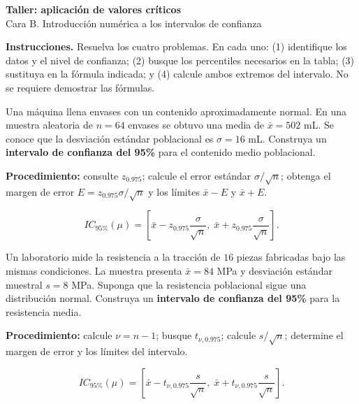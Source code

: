 \documentclass[
  spanish,
  12pt,
  letterpaper]{article}
\begin{document}
\newpage

\begin{center}
{\Large\bfseries Taller: aplicación de valores críticos}\\[-1pt]
{\small Cara B. Introducción numérica a los intervalos de confianza}
\end{center}

\textbf{Instrucciones.} Resuelva los cuatro problemas. En cada uno: (1)
identifique los datos y el nivel de confianza; (2) busque los
percentiles necesarios en la tabla; (3) sustituya en la fórmula
indicada; y (4) calcule ambos extremos del intervalo. No se requiere
demostrar las fórmulas.

\par\vspace{3pt}

Una máquina llena envases con un contenido aproximadamente normal. En
una muestra aleatoria de \(n=64\) envases se obtuvo una media de
\(\bar x=502\) mL. Se conoce que la desviación estándar poblacional es
\(\sigma=16\) mL. Construya un \textbf{intervalo de confianza del 95\%}
para el contenido medio poblacional.

\textbf{Procedimiento:} consulte \(z_{0.975}\); calcule el error
estándar \(\sigma/\sqrt n\); obtenga el margen de error
\(E=z_{0.975}\sigma/\sqrt n\) y los límites \(\bar x-E\) y \(\bar x+E\).

\[IC_{95\%}(\mu)=\left[\bar x-z_{0.975}\frac{\sigma}{\sqrt n},\;\bar x+z_{0.975}\frac{\sigma}{\sqrt n}\right].\]

\par\vspace{3pt}

Un laboratorio mide la resistencia a la tracción de \(16\) piezas
fabricadas bajo las mismas condiciones. La muestra presenta
\(\bar x=84\) MPa y desviación estándar muestral \(s=8\) MPa. Suponga
que la resistencia poblacional sigue una distribución normal. Construya
un \textbf{intervalo de confianza del 95\%} para la resistencia media.

\textbf{Procedimiento:} calcule \(\nu=n-1\); busque \(t_{\nu,0.975}\);
calcule \(s/\sqrt n\); determine el margen de error y los límites del
intervalo.

\[IC_{95\%}(\mu)=\left[\bar x-t_{\nu,0.975}\frac{s}{\sqrt n},\;\bar x+t_{\nu,0.975}\frac{s}{\sqrt n}\right].\]
\end{document}

